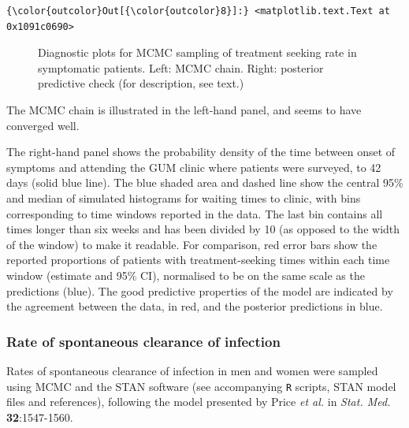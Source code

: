 \documentclass{article}
\begin{document}
    \begin{footnotesize}
            \begin{Verbatim}[commandchars=\\\{\}]
{\color{outcolor}Out[{\color{outcolor}8}]:} <matplotlib.text.Text at 0x1091c0690>
\end{Verbatim}
    \end{footnotesize}
        
    \begin{figure}
        \begin{center}\end{center}
        \caption{Diagnostic plots for MCMC sampling of treatment seeking rate in symptomatic patients. Left: MCMC chain. Right: posterior predictive check (for description, see text.)}
        \label{fig:trt_seek_diagnostic}
    \end{figure}
    
    The MCMC chain is illustrated in the left-hand panel, and seems to have
converged well.

The right-hand panel shows the probability density of the time between
onset of symptoms and attending the GUM clinic where patients were
surveyed, to 42 days (solid blue line). The blue shaded area and dashed
line show the central 95\% and median of simulated histograms for
waiting times to clinic, with bins corresponding to time windows
reported in the data. The last bin contains all times longer than six
weeks and has been divided by 10 (as opposed to the width of the window)
to make it readable. For comparison, red error bars show the reported
proportions of patients with treatment-seeking times within each time
window (estimate and 95\% CI), normalised to be on the same scale as the
predictions (blue). The good predictive properties of the model are
indicated by the agreement between the data, in red, and the posterior
predictions in blue.

    \subsubsection{Rate of spontaneous clearance of
infection}\label{rate-of-spontaneous-clearance-of-infection}

Rates of spontaneous clearance of infection in men and women were
sampled using MCMC and the STAN software (see accompanying \texttt{R}
scripts, STAN model files and references), following the model presented
by Price \emph{et al.} in \emph{Stat. Med.} \textbf{32}:1547-1560.
\end{document}
